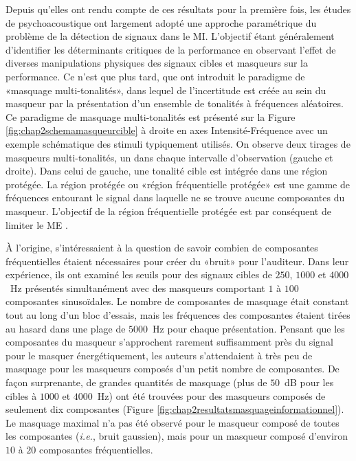 Depuis qu'elles ont rendu compte de ces résultats pour la première fois, les études de psychoacoustique ont largement adopté une approche paramétrique du problème de la détection de signaux dans le MI.
L'objectif étant généralement d'identifier les déterminants critiques de la performance en observant l'effet de diverses manipulations physiques des signaux cibles et masqueurs sur la performance. 
Ce n'est que plus tard, que \cite{neff1987masking} ont introduit le paradigme de «masquage multi-tonalités», dans lequel de l'incertitude est créée au sein du masqueur par la présentation d'un ensemble de tonalités à fréquences aléatoires. 
Ce paradigme de masquage multi-tonalités \citep{neff1987masking} est présenté sur la Figure \ref{fig:chap2schemamasqueurcible} à droite en axes Intensité-Fréquence avec un exemple schématique des stimuli typiquement utilisés. 
On observe deux tirages de masqueurs multi-tonalités, un dans chaque intervalle d'observation (gauche et droite). 
Dans celui de gauche, une tonalité cible est intégrée dans une région protégée. 
La région protégée ou «région fréquentielle protégée» est une gamme de fréquences entourant le signal dans laquelle ne se trouve aucune composantes du masqueur. 
L'objectif de la région fréquentielle protégée est par conséquent de limiter le ME \citep{neff1988effective}. 

À l'origine, \cite{neff1987masking} s'intéressaient à la question de savoir combien de composantes fréquentielles étaient nécessaires pour créer du «bruit» pour l'auditeur. 
Dans leur expérience, ils ont examiné les seuils pour des signaux cibles de $250$, $1000$ et $4000$~Hz présentés simultanément avec des masqueurs comportant $1$ à $100$ composantes sinusoïdales. 
Le nombre de composantes de masquage était constant tout au long d’un bloc d’essais, mais les fréquences des composantes étaient tirées au hasard dans une plage de $5000$~Hz pour chaque présentation. 
Pensant que les composantes du masqueur s'approchent rarement suffisamment près du signal pour le masquer énergétiquement, les auteurs s'attendaient à très peu de masquage pour les masqueurs composés d'un petit nombre de composantes. 
De façon surprenante, de grandes quantités de masquage (plus de $50$~dB pour les cibles à $1000$ et $4000$~Hz) ont été trouvées pour des masqueurs composés de seulement dix composantes (Figure \ref{fig:chap2resultatsmasquageinformationnel}).
Le masquage maximal n'a pas été observé pour le masqueur composé de toutes les composantes (\textit{i.e.}, bruit gaussien), mais pour un masqueur composé d'environ $10$ à $20$ composantes fréquentielles. 


